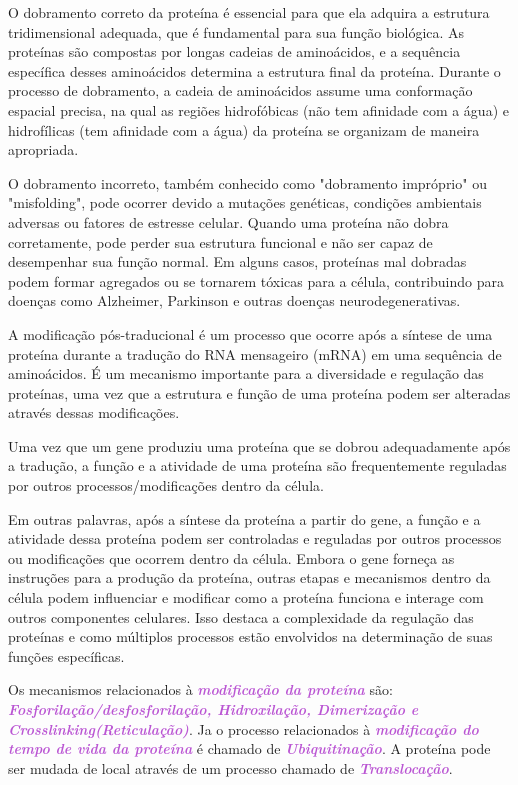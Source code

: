 \documentclass[11pt,a4paper]{article}
\begin{document}
	O dobramento correto da proteína é essencial para que ela adquira a estrutura tridimensional adequada, que é fundamental para sua função biológica. As proteínas são compostas por longas cadeias de aminoácidos, e a sequência específica desses aminoácidos determina a estrutura final da proteína. Durante o processo de dobramento, a cadeia de aminoácidos assume uma conformação espacial precisa, na qual as regiões hidrofóbicas (não tem afinidade com a água)  e hidrofílicas (tem afinidade com a água) da proteína se organizam de maneira apropriada.
		
	O dobramento incorreto, também conhecido como "dobramento impróprio" ou "misfolding", pode ocorrer devido a mutações genéticas, condições ambientais adversas ou fatores de estresse celular. Quando uma proteína não dobra corretamente, pode perder sua estrutura funcional e não ser capaz de desempenhar sua função normal. Em alguns casos, proteínas mal dobradas podem formar agregados ou se tornarem tóxicas para a célula, contribuindo para doenças como Alzheimer, Parkinson e outras doenças neurodegenerativas.

	A modificação pós-traducional é um processo que ocorre após a síntese de uma proteína durante a tradução do RNA mensageiro (mRNA) em uma sequência de aminoácidos. É um mecanismo importante para a diversidade e regulação das proteínas, uma vez que a estrutura e função de uma proteína podem ser alteradas através dessas modificações.

	Uma vez que um gene produziu uma proteína que se dobrou adequadamente após a tradução, a função e a atividade de uma proteína são frequentemente reguladas por outros processos/modificações dentro da célula.

	Em outras palavras, após a síntese da proteína a partir do gene, a função e a atividade dessa proteína podem ser controladas e reguladas por outros processos ou modificações que ocorrem dentro da célula. Embora o gene forneça as instruções para a produção da proteína, outras etapas e mecanismos dentro da célula podem influenciar e modificar como a proteína funciona e interage com outros componentes celulares. Isso destaca a complexidade da regulação das proteínas e como múltiplos processos estão envolvidos na determinação de suas funções específicas.

	Os mecanismos relacionados à \textcolor{MediumOrchid}{\textbf{\textit{modificação da proteína}}} são: \textcolor{MediumOrchid}{\textbf{\textit{Fosforilação/desfosforilação, Hidroxilação, Dimerização e Crosslinking(Reticulação)}}}. Ja o processo relacionados à \textcolor{MediumOrchid}{\textbf{\textit{modificação do tempo de vida da proteína}}} é chamado de \textcolor{MediumOrchid}{\textbf{\textit{Ubiquitinação}}}. A proteína pode ser mudada de local através de um processo chamado de \textcolor{MediumOrchid}{\textbf{\textit{Translocação}}}.
		
\end{document}
